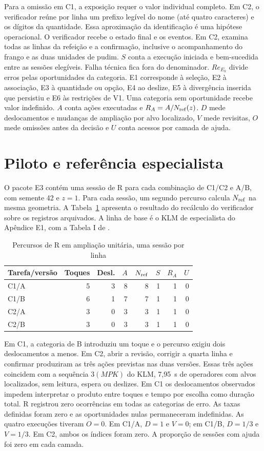 Para a omissão em C1, a exposição requer o valor individual completo. Em C2, o verificador reúne por linha um prefixo legível do nome (até quatro caracteres) e os dígitos da quantidade. Essa aproximação da identificação é uma hipótese operacional. O verificador recebe o estado final e os eventos. Em C2, examina todas as linhas da refeição e a confirmação, inclusive o acompanhamento do frango e as duas unidades de pudim. $S$ conta a execução iniciada e bem-sucedida entre as sessões elegíveis. Falha técnica fica fora do denominador. $Re_{E_k}$ divide erros pelas oportunidades da categoria. E1 corresponde à seleção, E2 à associação, E3 à quantidade ou opção, E4 ao deslize, E5 à divergência inserida que persistiu e E6 às restrições de V1. Uma categoria sem oportunidade recebe valor indefinido. $A$ conta ações executadas e $R_A=A/N_{\rm ref}(z)$. $D$ mede deslocamentos e mudanças de ampliação por alvo localizado, $V$ mede revisitas, $O$ mede omissões antes da decisão e $U$ conta acessos por camada de ajuda.

\section{Piloto e referência especialista}
O pacote E3 contém uma sessão de R para cada combinação de C1/C2 e A/B, com semente 42 e $z=1$. Para cada sessão, um segundo percurso calcula $N_{\rm ref}$ na mesma geometria. A Tabela~\ref{tab:pilot} apresenta o resultado do recálculo do verificador sobre os registros arquivados. A linha de base é o KLM de especialista do Apêndice E1, com a Tabela I de \cite[p.~399]{card80}.

\begin{table}[ht]
\caption{Percursos de R em ampliação unitária, uma sessão por linha}
\label{tab:pilot}\centering\small
\begin{tabular}{@{}lrrrrrrr@{}}\hline
Tarefa/versão & Toques & Desl. & $A$ & $N_{\rm ref}$ & $S$ & $R_A$ & $U$\\ \hline
C1/A & 5 & 3 & 8 & 8 & 1 & 1 & 0\\
C1/B & 6 & 1 & 7 & 7 & 1 & 1 & 0\\
C2/A & 3 & 0 & 3 & 3 & 1 & 1 & 0\\
C2/B & 3 & 0 & 3 & 3 & 1 & 1 & 0\\ \hline
\end{tabular}
\end{table}
Em C1, a categoria de B introduziu um toque e o percurso exigiu dois deslocamentos a menos. Em C2, abrir a revisão, corrigir a quarta linha e confirmar produziram as três ações previstas nas duas versões. Essas três ações coincidem com a sequência $3(MPK)$ do KLM, 7,95~s de operadores com alvos localizados, sem leitura, espera ou deslizes. Em C1 os deslocamentos observados impedem interpretar o produto entre toques e tempo por escolha como duração total. R registrou zero ocorrências em todas as categorias de erro. As taxas definidas foram zero e as oportunidades nulas permaneceram indefinidas. As quatro execuções tiveram $O=0$. Em C1/A, $D=1$ e $V=0$; em C1/B, $D=1/3$ e $V=1/3$. Em C2, ambos os índices foram zero. A proporção de sessões com ajuda foi zero em cada camada.

